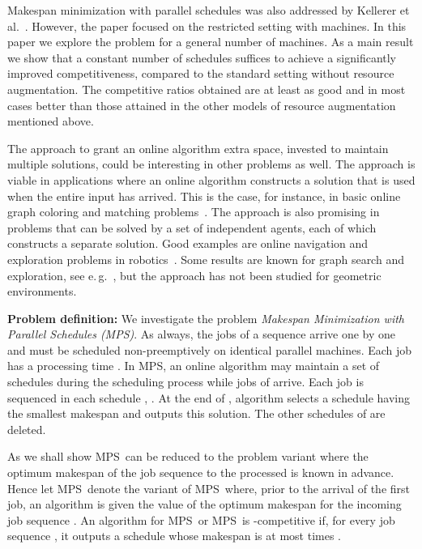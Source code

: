 \documentclass{llncs}
\newcommand{\MPS}{{\rm MPS}}
\newcommand{\MPSO}{{\rm MPS}}
\begin{document}
Makespan minimization with parallel schedules was also addressed by Kellerer et al.~\cite{KKST}. 
However, the paper focused on the restricted setting with   machines.
In this paper we explore the problem for a
general number  of machines. As a main result we show that a constant number of schedules
suffices to achieve a significantly improved competitiveness, compared to the standard setting
without resource augmentation. The competitive ratios obtained are at least 
as good and in most cases better than those attained in the other models of resource augmentation 
mentioned above. 

The approach to grant an online algorithm extra space, invested to maintain multiple solutions,
could be interesting in other problems as well. The approach is viable in applications where an 
online algorithm constructs a solution that is used when the entire input has arrived.  
This is the case, for instance, in basic online graph coloring and matching problems~\cite{I,KVV,LST}. 
The approach is also promising in problems that can be solved by a set of independent agents, each of 
which constructs a separate solution. Good examples are online navigation and exploration problems
in robotics~\cite{BC,BRS,DKP}. Some results are known for graph search and 
exploration, see e.\,g.~\cite{BS,FGK,LS}, but the approach has not been studied for geometric 
environments.

\vspace*{0.1cm}

{\bf Problem definition:}
We investigate the problem {\em Makespan Minimization with Parallel Schedules (MPS)\/}. As always, the
jobs of a sequence  arrive one by one and must be scheduled 
non-preemptively on  identical parallel machines. Each job  has a processing time . 
In \MPS, an online algorithm  may maintain a set  of schedules
during the scheduling process while jobs of  arrive. Each job  is sequenced 
in each schedule , . At the end of , algorithm  selects a schedule 
 having the smallest makespan and outputs this solution. The other schedules of 
are deleted. 

As we shall show \MPS\ can be reduced to the problem variant where the optimum makespan of the job sequence
to the processed is known in advance. Hence let \MPSO\ denote the variant of \MPS\ where, prior to the
arrival of the first job, an algorithm  is given the value of the optimum makespan
 for the incoming job sequence . 
An algorithm  for \MPS\ or \MPSO\ is 
-competitive if, for every job sequence , it outputs a schedule whose makespan is at most 
 times .
\end{document}
